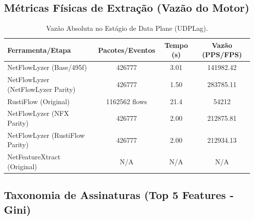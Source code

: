 \documentclass[11pt,a4paper]{article}
\begin{document}
\subsection{Métricas Físicas de Extração (Vazão do Motor)}
\begin{table}[H]
\centering
\begin{threeparttable}
\begin{tabular}{lccc}
\toprule
\textbf{Ferramenta/Etapa} & \textbf{Pacotes/Eventos} & \textbf{Tempo (s)} & \textbf{Vazão (PPS/FPS)} \\
\midrule
NetFlowLyzer (Base/495f) & 426777 & 3.01 & 141982.42 \\
NetFlowLyzer (NetFlowLyzer Parity) & 426777 & 1.50 & 283785.11 \\
RustiFlow (Original) & 1162562 flows & 21.4 & 54212 \\
NetFlowLyzer (NFX Parity) & 426777 & 2.00 & 212875.81 \\
NetFlowLyzer (RustiFlow Parity) & 426777 & 2.00 & 212934.13 \\
NetFeatureXtract (Original) & N/A & N/A & N/A \\
\bottomrule
\end{tabular}
\end{threeparttable}
\caption{Vazão Absoluta no Estágio de Data Plane (UDPLag).}
\end{table}

\subsection{Taxonomia de Assinaturas (Top 5 Features - Gini)}
\begin{table}[H]
\centering
{}
\caption{Principais atributos de correlação estocástica por limiar dimensional (UDPLag).}
\end{table}

\newpage
\end{document}
